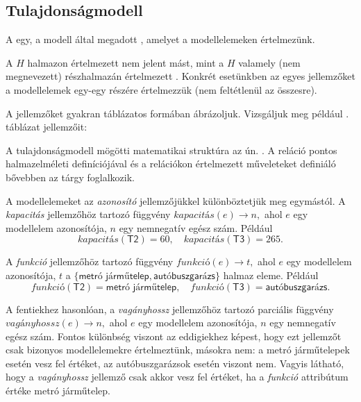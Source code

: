 \subsection{Tulajdonságmodell}

\begin{definicio}
	A  egy, a modell által megadott , amelyet a modellelemeken értelmezünk.
\end{definicio}

\begin{megjegyzes}
	A $H$ halmazon értelmezett  nem jelent mást, mint a $H$ valamely (nem megnevezett) részhalmazán értelmezett . Konkrét esetünkben az egyes jellemzőket a modellelemek egy-egy részére értelmezzük (nem feltétlenül az összesre).
\end{megjegyzes}

A jellemzőket gyakran táblázatos formában ábrázoljuk. Vizsgáljuk meg például . táblázat jellemzőit:

\begin{table}[H]
	\centering
	
\end{table}


\begin{megjegyzes}
	A tulajdonságmodell mögötti matematikai struktúra az ún. . A reláció pontos halmazelméleti definíciójával és a relációkon értelmezett műveleteket definiáló  bővebben az \adatb tárgy foglalkozik.
\end{megjegyzes}

A modellelemeket az \textit{azonosító} jellemzőjükkel különböztetjük meg egymástól. %
A \textit{kapacitás} jellemzőhöz tartozó függvény
$\mathit{kapacitás}(e) \rightarrow n,$
ahol $e$ egy modellelem azonosítója, $n$ egy nemnegatív egész szám.
Például
$$\mathit{kapacitás}(\mathsf{T2}) = 60, \quad \mathit{kapacitás}(\mathsf{T3}) = 265.$$

A \textit{funkció} jellemzőhöz tartozó függvény
$\mathit{funkció}(e) \rightarrow t,$
ahol $e$ egy modellelem azonosítója, $t$ a $\{\textsf{metró járműtelep}, \textsf{autóbuszgarázs}\}$ halmaz eleme.
Például
$$\mathit{funkció}(\mathsf{T2}) = \textsf{metró járműtelep}, \quad \mathit{funkció}(\mathsf{T3}) = \textsf{autóbuszgarázs}.$$

A fentiekhez hasonlóan, a \textit{vagányhossz} jellemzőhöz tartozó parciális függvény
$\mathit{vagányhossz}(e) \rightarrow n,$
ahol $e$ egy modellelem azonosítója, $n$ egy nemnegatív egész szám. Fontos különbség viszont az eddigiekhez képest, hogy ezt jellemzőt csak bizonyos modellelemekre értelmeztünk, másokra nem: a metró járműtelepek esetén vesz fel értéket, az autóbuszgarázsok esetén viszont nem. Vagyis látható, hogy a \textit{vagányhossz} jellemző csak akkor vesz fel értéket, ha a \textit{funkció} attribútum értéke \textsf{metró járműtelep}.


